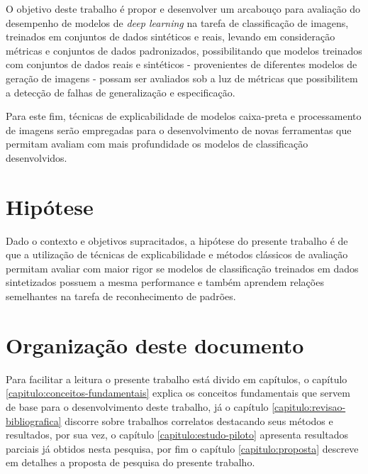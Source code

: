 O objetivo deste trabalho é propor e desenvolver um arcabouço para avaliação do desempenho de modelos de \textit{deep learning} na tarefa de classificação de imagens, treinados em conjuntos de dados sintéticos e reais, levando em consideração métricas e conjuntos de dados padronizados, possibilitando que modelos treinados com conjuntos de dados reais e sintéticos - provenientes de diferentes modelos de geração de imagens - possam ser avaliados sob a luz de métricas que possibilitem a detecção de falhas de generalização e especificação.

Para este fim, técnicas de explicabilidade de modelos caixa-preta e processamento de imagens serão empregadas para o desenvolvimento de novas ferramentas que permitam avaliam com mais profundidade os modelos de classificação desenvolvidos.

\section{Hipótese}

Dado o contexto e objetivos supracitados, a hipótese do presente trabalho é de que a utilização de técnicas de explicabilidade e métodos clássicos de avaliação permitam avaliar com maior rigor se modelos de classificação treinados em dados sintetizados possuem a mesma performance e também aprendem relações semelhantes na tarefa de reconhecimento de padrões.

\section{Organização deste documento}

Para facilitar a leitura o presente trabalho está divido em capítulos, o capítulo \ref{capitulo:conceitos-fundamentais} explica os conceitos fundamentais que servem de base para o desenvolvimento deste trabalho, já o capítulo \ref{capitulo:revisao-bibliografica} discorre sobre trabalhos correlatos destacando seus métodos e resultados, por sua vez, o capítulo \ref{capitulo:estudo-piloto} apresenta resultados parciais já obtidos nesta pesquisa, por fim o capítulo \ref{capitulo:proposta} descreve em detalhes a proposta de pesquisa do presente trabalho.